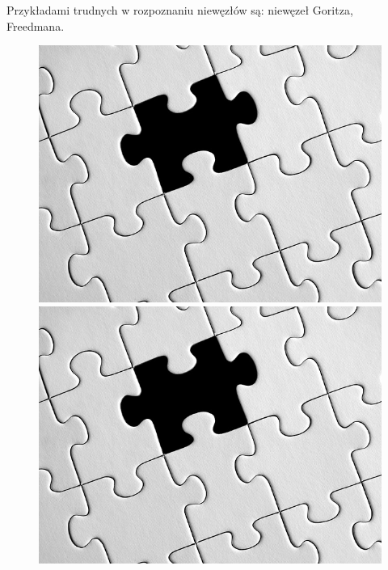 Przykładami trudnych w rozpoznaniu niewęzłów są: niewęzeł Goritza, Freedmana.

\begin{figure}[H]
	\begin{minipage}[b]{.32\linewidth}
		\centering
		\includegraphics[width=\linewidth]{../data/missing.jpg}
	\end{minipage}
	\begin{minipage}[b]{.32\linewidth}
		\centering
		\includegraphics[width=\linewidth]{../data/missing.jpg}
	\end{minipage}
	\begin{minipage}[b]{.32\linewidth}
		\centering

\end{minipage}
\end{figure}
